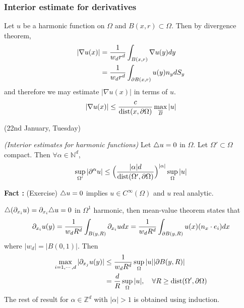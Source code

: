 \documentclass[12pt,a4paper]{article}
\newenvironment{proof}
{\begin{changemargin}{0.5cm}{0.5cm} 
	}%
	{\end{changemargin}
}
\newenvironment{p}
{\begin{proof} 
	}%
	{\end{proof}
}
\begin{document}
\subsubsection*{Interior estimate for derivatives}

Let $u$ be a harmonic function on $\Omega$ and $B(x, r) \subset \Omega$. Then by divergence theorem,
\begin{align*}
|\nabla u(x)| &= \frac{1}{w_d r^d} \int_{B(x, r)} \nabla u(y) dy \\
& = \frac{1}{w_d r^d} \int_{\partial B(x, r)} u(y) n_y dS_y
\end{align*}
and therefore we may estimate $|\nabla u(x)|$ in terms of $u$.
\begin{align*}
|\nabla u(x)| \leq \frac{c}{\text{dist}(x, \partial \Omega)} \max_{\overline{B}} |u|
\end{align*}
\s

\newday

(22nd January, Tuesday)
\s



 \emph{(Interior estimates for harmonic functions)} Let $\triangle u =0$ in $\Omega$. Let $\Omega' \subset \Omega$ compact. Then $\forall \alpha \in \mathbb{N}^d$,
\begin{align*}
\sup_{\Omega'} |\partial^{\alpha}u| \leq \Big( \frac{|\alpha|d}{\text{dist}(\Omega', \partial \Omega)}\Big)^{|\alpha|} \sup_{\Omega} |u|
\end{align*}
\begin{p}
\textbf{Fact :} (Exercise) $\triangle u= 0$ implies $u\in C^{\infty}(\Omega)$ and $u$ real analytic.

\pf $\triangle(\partial_{x_i} u) = \partial_{x_i} \triangle u =0$ in $\Omega^1$ harmonic, then mean-value theorem states that
\begin{align*}
\partial_{x_i} u(y) = \frac{1}{w_d R^d} \int_{B(y ,R)} \partial_{x_i} u dx = \frac{1}{w_d R^d} \int_{\partial B(y, R)} u(x) (n_x \cdot e_i) dx
\end{align*}
where $|w_d| = |B(0,1)|$. Then
\begin{align*}
\max_{i=1, \cdots, d} |\partial_{x_{j}} u(y)| & \leq \frac{1}{w_d R^d} \sup_{\Omega} |u| |\partial B(y, R)|\\
& = \frac{d}{R} \sup_{\Omega}|u|, \quad \forall R \geq \text{dist}(\Omega', \partial \Omega)
\end{align*}
The rest of result for $\alpha \in \mathbb{Z}^d$ with $|\alpha|>1$ is obtained using induction.

\eop
\end{p}
\s
\end{document}
